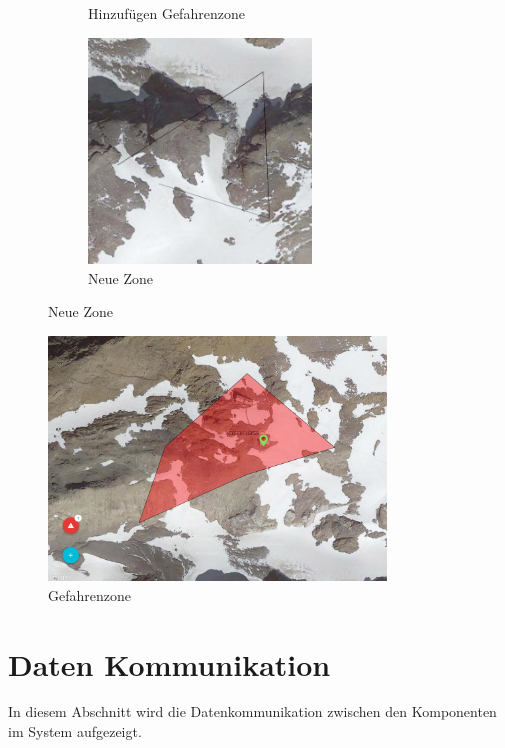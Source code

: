 \documentclass[11pt,english,german]{report}
\theoremstyle{definition}
\begin{document}
\begin{figure}[H]
\begin{subfigure}{.2\textwidth}
		\caption[Knopf zum hinzufügen von Gefahrenzonen]
		{Hinzufügen Gefahrenzone}
	\end{subfigure}%
	\begin{subfigure}{.6\textwidth}
		\centering
		\includegraphics[width=0.65\textwidth]{img/atasweb/atas-web-drawing.jpg}
		\caption[Neue Zone zeichnen]
		{Neue Zone}
	\end{subfigure}%
\end{figure}
\begin{figure}[H]
	\centering
	\includegraphics[width=0.8\textwidth]{img/atasweb/atas-web-dangerzone.jpg}
	\caption[Gefahrenzone]
	{Gefahrenzone}
\end{figure}%

\section{Daten Kommunikation}
In diesem Abschnitt wird die Datenkommunikation zwischen den Komponenten im System aufgezeigt.
\end{document}
